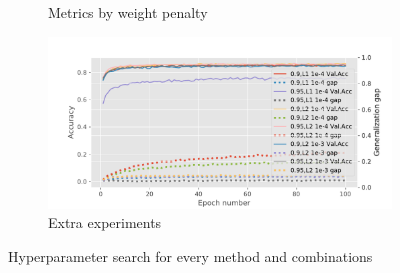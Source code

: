 {{\begin{figure}[t]
\begin{subfigure}{.3\linewidth}
        \caption{Metrics by weight penalty}
        \label{fig:weightrates}
    \end{subfigure} 
    \begin{subfigure}{.3\linewidth}
        \centering
        \includegraphics[width=.85\linewidth]{figures/extra.pdf}
        \caption{Extra experiments}
        \label{fig:extra}
    \end{subfigure} 
    \caption{Hyperparameter search for every method and combinations}
    \label{fig:hp_search}
\end{figure}
}
}


\newcommand{\questionTableOne} {
\youranswer{
Question Table 1 - Fill in Table 1 with the results from your experiments varying the number of hidden units.
%
\begin{table}[t]
    \centering
    \begin{tabular}{c|cc}
    \toprule
        \# hidden units & val. acc. & generalization gap \\
    \midrule
         32            & 0.788           & 0.148                   \\
         64            & 0.805           & 0.344                   \\
         128           & 0.807           & 0.811                   \\ 
    \bottomrule
    \end{tabular}
    \caption{Validation accuracy (\%) and generalization gap (in terms of cross-entropy error) for varying network widths on the EMNIST dataset.}
    \label{tab:width_exp}
\end{table}
}
}

